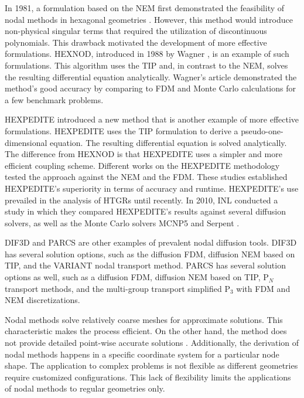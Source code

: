 In 1981, a formulation based on the \gls{NEM} first demonstrated the feasibility of nodal methods in hexagonal geometries \cite{duracz_nodal_1981}.
However, this method would introduce non-physical singular terms that required the utilization of discontinuous polynomials.
This drawback motivated the development of more effective formulations.
HEXNOD, introduced in 1988 by Wagner \cite{wagner_three-dimensional_1989}, is an example of such formulations.
This algorithm uses the \gls{TIP} and, in contrast to the \gls{NEM}, solves the resulting differential equation analytically.
Wagner's article demonstrated the method's good accuracy by comparing to \gls{FDM} and Monte Carlo calculations for a few benchmark problems.

HEXPEDITE \cite{fitzpatrick_hexpedite_1992} introduced a new method that is another example of more effective formulations.
HEXPEDITE uses the \gls{TIP} formulation to derive a pseudo-one-dimensional equation.
The resulting differential equation is solved analytically.
The difference from HEXNOD is that HEXPEDITE uses a simpler and more efficient coupling scheme.
Different works \cite{fitzpatrick_hexpedite_1992}\cite{fitzpatrick_developments_1995} on the HEXPEDITE methodology tested the approach against the \gls{NEM} and the \gls{FDM}.
These studies established HEXPEDITE’s superiority in terms of accuracy and runtime.
HEXPEDITE's use prevailed in the analysis of \glspl{HTGR} until recently.
In 2010, \gls{INL} conducted a study \cite{ortensi_deterministic_2010-1} in which they compared HEXPEDITE's results against several diffusion solvers, as well as the Monte Carlo solvers MCNP5 \cite{rsicc_computer_code_collection_mcnp5_2003} and Serpent \cite{leppanen_serpent_2015}.

DIF3D \cite{lawrence_dif3d_1983} and PARCS \cite{downar_parcs_2004} are other examples of prevalent nodal diffusion tools.
DIF3D has several solution options, such as the diffusion \gls{FDM}, diffusion \gls{NEM} based on \gls{TIP}, and the VARIANT nodal transport method.
PARCS has several solution options as well, such as a diffusion \gls{FDM}, diffusion \gls{NEM} based on \gls{TIP}, P$_{N}$ transport methods, and the multi-group transport simplified P$_3$ with \gls{FDM} and \gls{NEM} discretizations.

Nodal methods solve relatively coarse meshes for approximate solutions.
This characteristic makes the process efficient.
On the other hand, the method does not provide detailed point-wise accurate solutions \cite{kang_finite_1973}.
Additionally, the derivation of nodal methods happens in a specific coordinate system for a particular node shape.
The application to complex problems is not flexible as different geometries require customized configurations.
This lack of flexibility limits the applications of nodal methods to regular geometries only.

